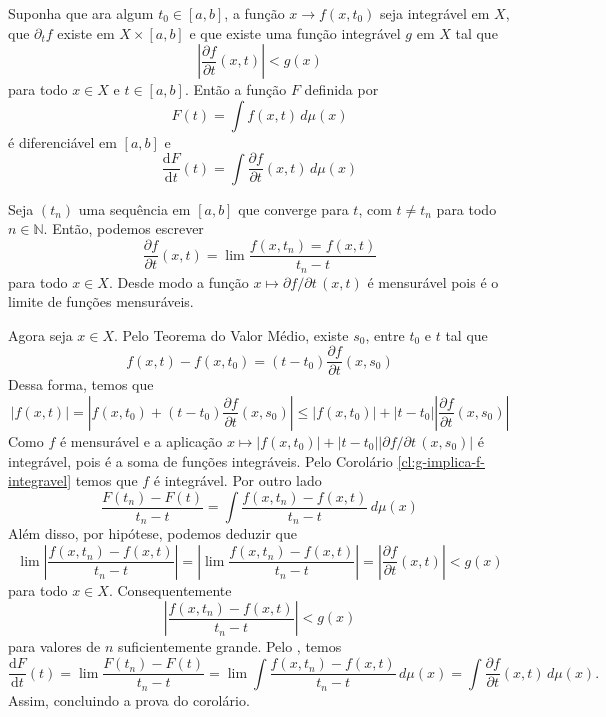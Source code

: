 \documentclass[a4paper, 11pt]{book}
\theoremstyle{definition}
\newcommand{\bN}{\mathbb{N}}
\begin{document}
\begin{cbox}
    Suponha que ara algum $t_0 \in [a,b]$, a função $x \to f(x,t_0)$ seja integrável em $X$, que $\partial_t f$ existe em $X \times [a,b]$ e que existe uma função integrável $g$ em $X$ tal que
    \[ 
        \left\vert \dfrac{\partial f}{\partial t}(x,t) \right\vert < g(x)
    \]
    para todo $x \in X$ e $t \in [a,b]$.
    Então a função $F$ definida por
    \[
        F(t) = \int f(x,t) \, d\mu(x)
    \]
    é diferenciável em $[a,b]$ e 
    \[
        \frac{\mathrm{d} F}{\mathrm{d}t}(t) = \int \dfrac{\partial f}{\partial t}(x,t) \,d\mu(x)
    \]
\end{cbox}
\begin{prf}
    Seja $(t_n)$ uma sequência em $[a,b]$ que converge para $t$, com $t \neq t_n$ para todo $n \in \bN$.
    Então, podemos escrever
    \[
        \dfrac{\partial f}{\partial t}(x,t) = \lim \frac{f(x,t_n) = f(x,t)}{t_n - t}
    \]
    para todo $x \in X$.
    Desde modo a função $x \mapsto \partial f/\partial t \,(x,t)$ é mensurável pois é o limite de funções mensuráveis.

    Agora seja $x \in X$.
    Pelo Teorema do Valor Médio, existe $s_0$, entre $t_0$ e $t$ tal que
    \[
        f(x,t) - f(x,t_0) = (t - t_0)\dfrac{\partial f}{\partial t} (x,s_0)
    \]
    Dessa forma, temos que
    \[
        |f(x,t)| = \left\vert f(x,t_0) + (t - t_0)\dfrac{\partial f}{\partial t}(x,s_0) \right\vert \leqslant |f(x,t_0)| + |t-t_0|\left\vert \dfrac{\partial f}{\partial t} (x,s_0) \right\vert
    \]
    Como $f$ é mensurável e a aplicação $x \mapsto |f(x,t_0)| + |t-t_0|\left\vert \partial f / \partial t \, (x,s_0) \right\vert$ é integrável, pois é a soma de funções integráveis. Pelo Corolário \ref{cl:g-implica-f-integravel} temos que $f$ é integrável.
    Por outro lado
    \[
        \frac{F(t_n) - F(t)}{t_n - t} = \int \frac{f(x,t_n) - f(x,t)}{t_n - t} \,d\mu(x)
    \]
    Além disso, por hipótese, podemos deduzir que
    \[
        \lim \left\vert \frac{f(x,t_n) - f(x,t)}{t_n - t} \right\vert =  \left\vert \lim\frac{f(x,t_n) - f(x,t)}{t_n - t} \right\vert = \left\vert \dfrac{\partial f}{\partial t}(x,t) \right\vert < g(x)
    \]
    para todo $x \in X$.
    Consequentemente
    \[
        \left\vert \frac{f(x,t_n) - f(x,t)}{t_n - t} \right\vert < g(x)
    \]
    para valores de $n$ suficientemente grande.
    Pelo , temos
    \[
        \frac{\mathrm{d} F}{\mathrm{d}t}(t) = \lim \frac{F(t_n) - F(t)}{t_n - t} = \lim  \int \frac{f(x,t_n) - f(x,t)}{t_n - t} \,d\mu(x) = \int \dfrac{\partial f}{\partial t} (x,t) \, d\mu(x).
    \]
    Assim, concluindo a prova do corolário.
\end{prf}
\end{document}
